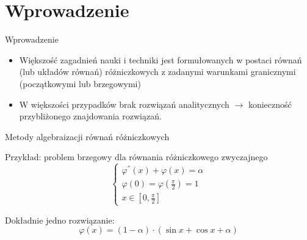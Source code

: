 \section{Wprowadzenie}

	\begin{frame}{Wprowadzenie}
		\begin{itemize}
			\item Większość zagadnień nauki i techniki jest formułowanych w postaci równań (lub układów równań) różniczkowych z zadanymi warunkami granicznymi (początkowymi lub brzegowymi)
					
			\item W większości przypadków brak rozwiązań analitycznych $\rightarrow$ konieczność przybliżonego znajdowania rozwiązań.
		\end{itemize}
	\end{frame}
	
		
	\begin{frame}{Metody algebraizacji równań różniczkowych}

		\begin{exampleblock}{Przykład: problem brzegowy dla równania różniczkowego zwyczajnego}
			$$
			\begin{cases}
				\varphi^{''}(x) + \varphi(x) = \alpha \\
				\varphi(0) = \varphi(\frac{\pi}{2}) = 1 \\
				x \in [0,\frac{\pi}{2}]
			\end{cases}
			$$
			
			Dokładnie jedno rozwiązanie:
			$$
			\varphi(x) = (1 - \alpha)\cdot(\sin{x} + \cos{x} + \alpha)
			$$			
		\end{exampleblock}
	
	\end{frame}
